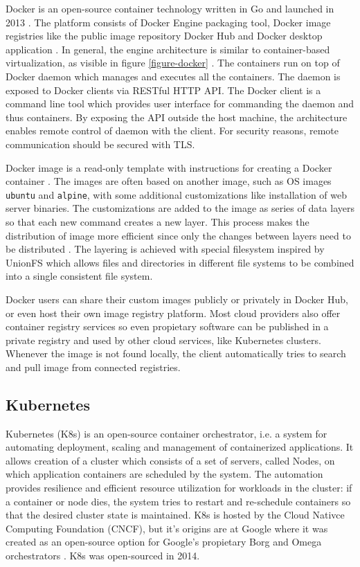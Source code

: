 \documentclass[english, 12pt, a4paper, sci, utf8, a-2b, online]{aaltothesis}
\begin{document}
Docker is an open-source container technology written in Go and launched in 2013 \cite[text]{docker-what}. The platform consists of Docker Engine packaging tool, Docker image registries like the public image repository Docker Hub and Docker desktop application \cite{docker-overview}. In general, the engine architecture is similar to container-based virtualization, as visible in figure \ref{figure-docker} \cite{bui2015analysis}. The containers run on top of Docker daemon which manages and executes all the containers. The daemon is exposed to Docker clients via RESTful HTTP API. The Docker client is a command line tool which provides user interface for commanding the daemon and thus containers. By exposing the API outside the host machine, the architecture enables remote control of daemon with the client. For security reasons, remote communication should be secured with TLS.

Docker image is a read-only template with instructions for creating a Docker container \cite{docker-overview}. The images are often based on another image, such as OS images \texttt{ubuntu} and \texttt{alpine}, with some additional customizations like installation of web server binaries. The customizations are added to the image as series of data layers so that each new command creates a new layer. This process makes the distribution of image more efficient since only the changes between layers need to be distributed \cite{bui2015analysis}. The layering is achieved with special filesystem inspired by UnionFS which allows files and directories in different file systems to be combined into a single consistent file system.

Docker users can share their custom images publicly or privately in Docker Hub, or even host their own image registry platform. Most cloud providers also offer container registry services so even propietary software can be published in a private registry and used by other cloud services, like Kubernetes clusters. Whenever the image is not found locally, the client automatically tries to search and pull image from connected registries.

\subsection{Kubernetes}

Kubernetes (K8s) \cite{kubernetes} is an open-source container orchestrator, i.e. a system for automating deployment, scaling and management of containerized applications. It allows creation of a cluster which consists of a set of servers, called Nodes, on which application containers are scheduled by the system. The automation provides resilience and efficient resource utilization for workloads in the cluster: if a container or node dies, the system tries to restart and re-schedule containers so that the desired cluster state is maintained. K8s is hosted by the Cloud Nativce Computing Foundation (CNCF), but it's origins are at Google where it was created as an open-source option for Google's propietary Borg and Omega orchestrators \cite{burns2016borg}. K8s was open-sourced in 2014.
\end{document}
